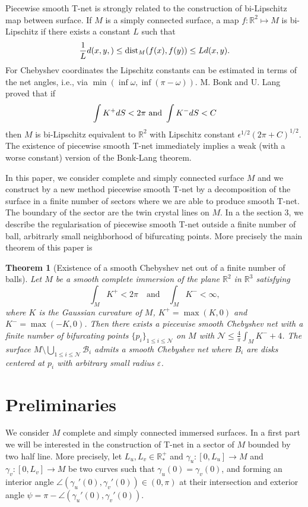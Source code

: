 \documentclass{article}
\newcommand{\R}{\mathbb{R}}
\newcommand{\surf}{M}
\newcommand{\N}{\mathcal{N}}
\newtheorem{theorem}{Theorem}
\theoremstyle{remark}
\theoremstyle{prpart}
\newcommand{\B}{\mathcal{B}}
\begin{document}
Piecewise smooth T-net is strongly related to the construction of bi-Lipschitz map between surface. If $M$ is a simply connected surface,
 a map $f: \R^2 \mapsto M$ is bi-Lipschitz if there exists a constant $L$ such that
 $$\frac1L d(x,y,) \leq {\rm dist}_M(f(x),f(y)) \leq L d(x,y).$$
For Chebyshev coordinates the Lipschitz constants can be estimated in terms of the net angles, i.e., via $\min \left( \inf \omega , \inf (\pi - \omega)\right)$.
M. Bonk and U. Lang \cite{bonk} proved that if
$$\int K^+ dS <2\pi \hbox{ and } \int K^- dS<C$$
then $M$ is bi-Lipschitz equivalent to $\R^2$ with Lipschitz constant $\epsilon^{1/2}(2\pi + C)^{1/2}$. The existence of piecewise smooth T-net immediately implies a weak (with a worse constant) version of the Bonk-Lang theorem. 

In this paper, we consider complete and simply connected surface $M$ and we construct by a new method piecewise smooth T-net
by a decomposition of the surface in a finite number of sectors where we are able to produce smooth T-net. 
The boundary of the sector are the twin crystal lines on $M$. In a the section 3, we describe the regularisation of piecewise smooth T-net
outside a finite number of ball, arbitrarly small neighborhood of bifurcating points. More precisely the main theorem of this paper is 


\begin{theorem}[Existence of a smooth Chebyshev net out of a finite
    number of balls]\label{thm:main_thm}
Let $\surf$ be a smooth complete immersion of the plane $\R^2$ in $\R^3$ satisfying
\begin{equation} \label{eq:cond-thm}
  \int_{\surf}K^+<2\pi\quad\text{and}\quad\int_{\surf}K^-<\infty,
\end{equation}
where $K$ is the Gaussian curvature of $\surf$, $K^+=\max(K,0)$ and $K^-=\max(-K,0)$. 
Then there exists a piecewise smooth Chebyshev net with a finite number of bifurcating points $\{ p_i \}_{1\leq i\leq \N}$ on $M$ with 
$\N \leq  \frac{4}{\pi}\int_\surf K^-+4$. The surface $M\setminus\bigcup_{1\leq i\leq \N}\B_i$
admits a smooth Chebyshev net where $B_i$ are disks centered at $p_i$ with arbitrary small radius $\varepsilon$.  
\end{theorem}

\section{Preliminaries}

We consider $M$ complete and simply connected immersed surfaces. 
In a first part we will be interested in the construction of T-net in a sector
of $M$ bounded by two half line. More precisely, let $L_u,L_v\in\R_\ast^+$ and
$\gamma_u:[0,L_u]\to\surf$ and $\gamma_v:[0,L_v]\to\surf$ be
 two curves  such that $\gamma_u(0)=\gamma_v(0)$, and forming an
 interior angle $\angle(\gamma_u'(0),\gamma_v'(0))\in(0,\pi)$ at their
 intersection and exterior angle $\psi=\pi-\angle(\gamma_u'(0),\gamma_v'(0))$.
\end{document}
